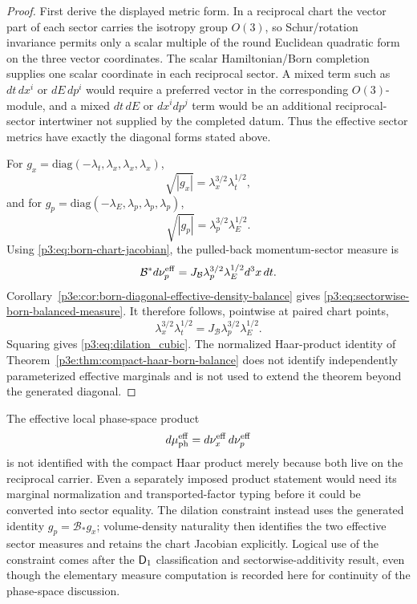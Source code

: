 \documentclass[12pt,a4paper]{article}
\begin{document}
\begin{proof}
First derive the displayed metric form.  In a reciprocal chart the vector part of each sector carries the isotropy group \(O(3)\), so Schur/rotation invariance permits only a scalar multiple of the round Euclidean quadratic form on the three vector coordinates.  The scalar Hamiltonian/Born completion supplies one scalar coordinate in each reciprocal sector.  A mixed term such as \(dt\,dx^i\) or \(dE\,dp^i\) would require a preferred vector in the corresponding \(O(3)\)-module, and a mixed \(dt\,dE\) or \(dx^i dp^j\) term would be an additional reciprocal-sector intertwiner not supplied by the completed datum.  Thus the effective sector metrics have exactly the diagonal forms stated above.

For
\(g_x=\mathrm{diag}(-\lambda_t,\lambda_x,\lambda_x,\lambda_x)\),
\[
 \sqrt{|g_x|}=\lambda_x^{3/2}\lambda_t^{1/2},
\]
and for
\(g_p=\mathrm{diag}(-\lambda_E,\lambda_p,\lambda_p,\lambda_p)\),
\[
 \sqrt{|g_p|}=\lambda_p^{3/2}\lambda_E^{1/2}.
\]
Using \eqref{p3:eq:born-chart-jacobian}, the pulled-back momentum-sector
measure is
\[
 \mathcal B^*d\nu_p^{\rm eff}
 =J_{\mathcal B}\lambda_p^{3/2}\lambda_E^{1/2}
   d^3x\,dt.
\]
Corollary~\ref{p3e:cor:born-diagonal-effective-density-balance} gives
\eqref{p3:eq:sectorwise-born-balanced-measure}.  It therefore follows,
pointwise at
paired chart points,
\[
 \lambda_x^{3/2}\lambda_t^{1/2}
 =J_{\mathcal B}\lambda_p^{3/2}\lambda_E^{1/2}.
\]
Squaring gives \eqref{p3:eq:dilation_cubic}.  The normalized Haar-product
identity of Theorem~\ref{p3e:thm:compact-haar-born-balance} does not identify
independently parameterized effective marginals and is not used to extend the
theorem beyond the generated diagonal.
\end{proof}

\begin{remark}
\label{p3:rem:product-vs-sectorwise-balance}
The effective local phase-space product
\[
 d\mu_{\rm ph}^{\rm eff}=d\nu_x^{\rm eff}\,d\nu_p^{\rm eff}
\]
is not identified with the compact Haar product merely because both live on
the reciprocal carrier.  Even a separately imposed product statement would
need its marginal normalization and transported-factor typing before it could
be converted into sector equality.  The dilation constraint instead uses
the generated identity \(g_p=\mathcal B_*g_x\); volume-density naturality then
identifies the two effective sector measures and retains the chart Jacobian
explicitly.  Logical use of the constraint comes
after the \(\mathsf{D}_1\) classification and sectorwise-additivity result, even
though the elementary measure computation is recorded here for continuity of
the phase-space discussion.
\end{remark}
\end{document}
